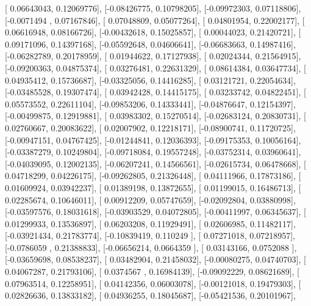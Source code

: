 \documentclass{article}
\begin{document}
       [ 0.06643043,  0.12069776],
       [-0.08426775,  0.10798205],
       [-0.09972303,  0.07118806],
       [-0.0071494 ,  0.07167846],
       [ 0.07048809,  0.05077264],
       [ 0.04801954,  0.22002177],
       [ 0.06616948,  0.08166726],
       [-0.00432618,  0.15025857],
       [ 0.00044023,  0.21420721],
       [ 0.09171096,  0.14397168],
       [-0.05592648,  0.04606641],
       [-0.06683663,  0.14987416],
       [-0.06282789,  0.20178959],
       [ 0.01944622,  0.17127938],
       [ 0.02024344,  0.21564915],
       [-0.09200363,  0.04875374],
       [ 0.03276481,  0.22631329],
       [ 0.08614384,  0.03647734],
       [ 0.04935412,  0.15736687],
       [-0.03325056,  0.14416285],
       [ 0.03121721,  0.22054634],
       [-0.03485528,  0.19307474],
       [ 0.03942428,  0.14415175],
       [ 0.03233742,  0.04822451],
       [ 0.05573552,  0.22611104],
       [-0.09853206,  0.14333441],
       [-0.04876647,  0.12154397],
       [-0.00499875,  0.12919881],
       [ 0.03983302,  0.15270514],
       [-0.02683124,  0.20830731],
       [ 0.02760667,  0.20083622],
       [ 0.02007902,  0.12218171],
       [-0.08900741,  0.11720725],
       [-0.00947151,  0.04767425],
       [-0.01244841,  0.12036393],
       [-0.09175353,  0.10056164],
       [-0.03387279,  0.10249804],
       [-0.09718084,  0.19557248],
       [-0.03752314,  0.03960641],
       [-0.04039095,  0.12002135],
       [-0.06207241,  0.14566561],
       [-0.02615734,  0.06478668],
       [ 0.04718299,  0.04226175],
       [-0.09262805,  0.21326448],
       [ 0.04111966,  0.17873186],
       [ 0.01609924,  0.03942237],
       [ 0.01389198,  0.13872655],
       [ 0.01199015,  0.16486713],
       [ 0.02285674,  0.10646011],
       [ 0.00912209,  0.05747659],
       [-0.02092804,  0.03880998],
       [-0.03597576,  0.18031618],
       [-0.03903529,  0.04072805],
       [-0.00411997,  0.06345637],
       [ 0.01299933,  0.13536897],
       [ 0.06203208,  0.11929491],
       [ 0.02606985,  0.11482117],
       [-0.03921434,  0.21783774],
       [-0.10839419,  0.110249  ],
       [ 0.07271018,  0.07218957],
       [-0.0786059 ,  0.21388833],
       [-0.06656214,  0.0664359 ],
       [ 0.03143166,  0.0752088 ],
       [-0.03659698,  0.08538237],
       [ 0.03482904,  0.21458032],
       [-0.00080275,  0.04740703],
       [ 0.04067287,  0.21793106],
       [ 0.0374567 ,  0.16984139],
       [-0.09092229,  0.08621689],
       [ 0.07963514,  0.12258951],
       [ 0.04142356,  0.06003078],
       [-0.00121018,  0.19479303],
       [ 0.02826636,  0.13833182],
       [ 0.04936255,  0.18045687],
       [-0.05421536,  0.20101967],
\end{document}
